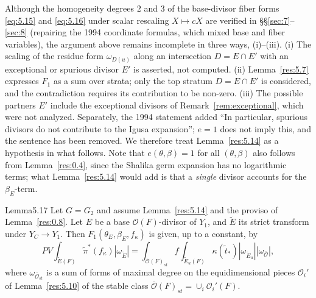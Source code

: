 \documentclass[12pt,letterpaper]{amsart}
\theoremstyle{plain}
\theoremstyle{definition}
\theoremstyle{remark}
\theoremstyle{definition}
\newcommand{\ovo}{\overline{\mathcal{O}}}
\begin{document}
\begin{rem26}\label{rem:5.14}
Although the homogeneity degrees $2$ and $3$ of the base-divisor fiber forms
\eqref{eq:5.15} and \eqref{eq:5.16} under scalar rescaling $X\mapsto cX$ are
verified in \S\S\ref{sec:7}--\ref{sec:8} (repairing the 1994 coordinate formulas,
which mixed base and fiber variables), the argument above remains incomplete in
three ways, (i)--(iii). (i) The scaling of the residue form $\omega_{D(u)}$ along an
intersection $D=E\cap E'$ with an exceptional or spurious divisor $E'$ is
asserted, not computed. (ii) Lemma~\ref{res:5.7}
expresses $F_1$ as a sum over strata; only the top stratum $D=E\cap E'$ is
considered, and the contradiction requires its contribution to be non-zero.
(iii) The possible partners $E'$ include the exceptional divisors of
Remark~\ref{rem:exceptional}, which were not analyzed. Separately, the 1994
statement added ``In particular, spurious divisors do not contribute to the
Igusa expansion''; $e=1$ does not imply this, and the sentence has been
removed. We therefore treat Lemma~\ref{res:5.14} as a hypothesis in what
follows. Note that $e(\theta,\beta)=1$ for all $(\theta,\beta)$ also follows
from Lemma~\ref{res:0.4}, since the Shalika germ expansion has no
logarithmic terms; what Lemma~\ref{res:5.14} would add is that a
\emph{single} divisor accounts for the $\beta_E$-term.
\end{rem26}

\begin{res}{Lemma}{5.17}\label{res:5.17}
Let $G=G_2$ and assume Lemma~\ref{res:5.14} and the proviso of
Lemma~\ref{res:0.8}.
Let $E$ be a base ${\mathcal O}(F)$-divisor of
$Y_1$, and $\tilde{E}$ its strict transform under
$Y_C\rightarrow Y_1$.
Then $F_1(\theta_E,\beta_E,f_\kappa)$ is given,
up to a constant, by
\[
PV\int_{\tilde{E}(F)}\tilde{\pi}^*(f_\kappa) |\omega_{\tilde{E}}|
=\int_{\ovo(F)_{st}}f
\int_{\tilde{E}_u(F)}\kappa(\tilde{t}_*)
|\omega_{\tilde{E}_u}||\omega_{\ovo}|,
\]
where $\omega_{\ovo_{st}}$
is a sum of forms of maximal degree on the
equidimensional pieces ${\mathcal O}_i'$ of Lemma~\ref{res:5.10}
of the stable class $\ovo(F)_{st}=\cup_i{\mathcal O}_i'(F)$.
\end{res}
\end{document}
